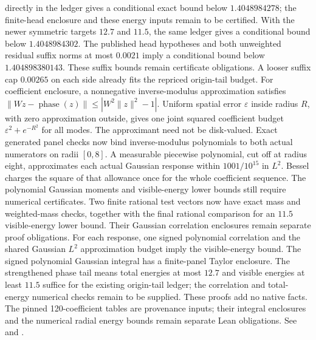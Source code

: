 \documentclass[11pt,a4paper]{article}
\newcommand{\ph}{\operatorname{phase}}
\begin{document}
directly in the ledger gives a conditional exact bound below $1.4048984278$;
the finite-head enclosure and these energy inputs remain to be certified. With
the newer symmetric targets $12.7$ and $11.5$, the same ledger gives a
conditional bound below $1.4048984302$.
The published head hypotheses and both unweighted residual suffix norms at most
$0.0021$ imply a conditional bound below $1.404898380143$. These suffix bounds
remain certificate obligations. A looser suffix cap $0.00265$ on each side
already fits the repriced origin-tail budget.
For coefficient enclosure, a nonnegative inverse-modulus
approximation satisfies
$\|Wz-\ph(z)\|\le|W^2\|z\|^2-1|$.
Uniform spatial error $\varepsilon$ inside radius $R$, with zero approximation
outside, gives one joint squared coefficient budget
$\varepsilon^2+e^{-R^2}$ for all modes. The approximant need not be disk-valued.
Exact generated panel checks now bind inverse-modulus polynomials to both
actual numerators on radii $[0,8]$. A measurable piecewise polynomial,
cut off at radius eight, approximates each actual Gaussian response within
$1001/10^{15}$ in $L^2$. Bessel charges the square of that allowance once
for the whole coefficient sequence. The polynomial Gaussian moments and
visible-energy lower bounds still require numerical certificates.
Two finite rational test vectors now have exact mass and weighted-mass
checks, together with the final rational comparison for an $11.5$
visible-energy lower bound. Their Gaussian correlation enclosures remain
separate proof obligations.
For each response, one signed polynomial correlation and the shared Gaussian
$L^2$ approximation budget imply the visible-energy bound. The signed
polynomial Gaussian integral has a finite-panel Taylor enclosure. The
strengthened phase tail means total energies at most $12.7$ and visible
energies at least $11.5$ suffice for the existing origin-tail ledger; the
correlation and total-energy numerical checks remain to be supplied.
These proofs add no native facts. The pinned 120-coefficient tables are
provenance inputs; their integral enclosures and the numerical radial energy
bounds remain separate Lean obligations. See 
and .
\end{document}
